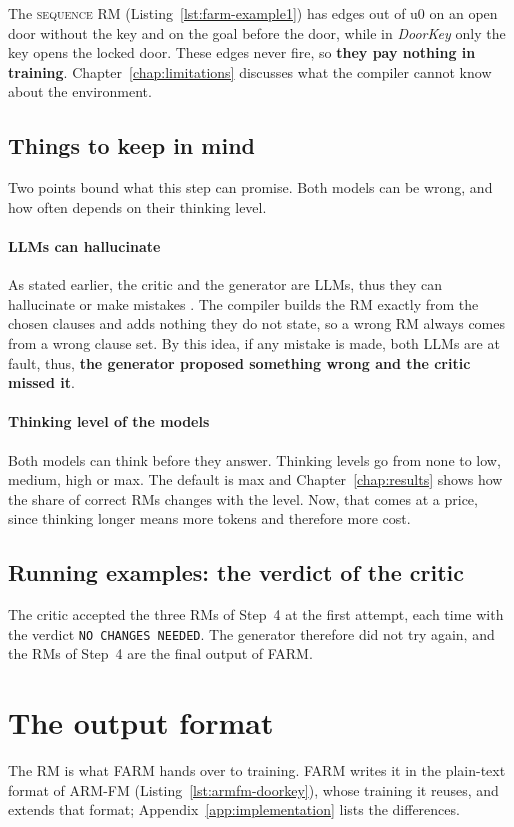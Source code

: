 \documentclass[11pt,english,listoffigures,listoftables]{tfgetsinf}
\newcommand{\runex}[1]{\textsc{#1}}  %
\newcommand{\env}[1]{\textsf{\slshape #1}}  %
\begin{document}
The \runex{sequence} RM (Listing~\ref{lst:farm-example1}) has edges out of u0 on an open door without the key and on the goal before the door, while in \env{DoorKey} only the key opens the locked door. These edges never fire, so \textbf{they pay nothing in training}. Chapter~\ref{chap:limitations} discusses what the compiler cannot know about the environment.

\subsection{Things to keep in mind}
Two points bound what this step can promise. Both models can be wrong, and how often depends on their thinking level.

\paragraph{LLMs can hallucinate} As stated earlier, the critic and the generator are LLMs, thus they can hallucinate or make mistakes \cite{huang2025survey}. The compiler builds the RM exactly from the chosen clauses and adds nothing they do not state, so a wrong RM always comes from a wrong clause set. By this idea, if any mistake is made, both LLMs are at fault, thus, \textbf{the generator proposed something wrong and the critic missed it}.

\paragraph{Thinking level of the models} Both models can think before they answer. Thinking levels go from none to low, medium, high or max. The default is max and Chapter~\ref{chap:results} shows how the share of correct RMs changes with the level. Now, that comes at a price, since thinking longer means more tokens and therefore more cost.

\subsection{Running examples: the verdict of the critic}
\label{sec:run-step5}
The critic accepted the three RMs of Step~4 at the first attempt, each time with the verdict \texttt{NO CHANGES NEEDED}. The generator therefore did not try again, and the RMs of Step~4 are the final output of FARM.

\section{The output format}
\label{sec:output-format}
The RM is what FARM hands over to training. FARM writes it in the plain-text format of ARM-FM (Listing~\ref{lst:armfm-doorkey}), whose training it reuses, and extends that format; Appendix~\ref{app:implementation} lists the differences.
\end{document}
